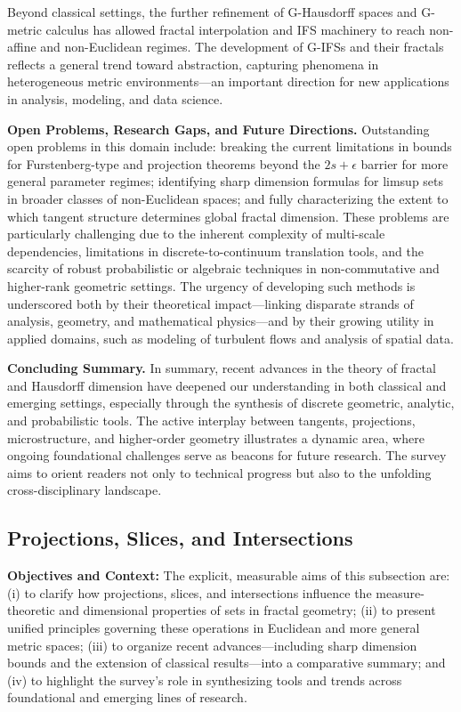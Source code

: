 \documentclass[sigconf]{acmart}
\begin{document}
Beyond classical settings, the further refinement of G-Hausdorff spaces and G-metric calculus has allowed fractal interpolation and IFS machinery to reach non-affine and non-Euclidean regimes. The development of G-IFSs and their fractals reflects a general trend toward abstraction, capturing phenomena in heterogeneous metric environments—an important direction for new applications in analysis, modeling, and data science.

\textbf{Open Problems, Research Gaps, and Future Directions.} Outstanding open problems in this domain include: breaking the current limitations in bounds for Furstenberg-type and projection theorems beyond the $2s+\epsilon$ barrier for more general parameter regimes; identifying sharp dimension formulas for limsup sets in broader classes of non-Euclidean spaces; and fully characterizing the extent to which tangent structure determines global fractal dimension. These problems are particularly challenging due to the inherent complexity of multi-scale dependencies, limitations in discrete-to-continuum translation tools, and the scarcity of robust probabilistic or algebraic techniques in non-commutative and higher-rank geometric settings. The urgency of developing such methods is underscored both by their theoretical impact—linking disparate strands of analysis, geometry, and mathematical physics—and by their growing utility in applied domains, such as modeling of turbulent flows and analysis of spatial data.

\textbf{Concluding Summary.} In summary, recent advances in the theory of fractal and Hausdorff dimension have deepened our understanding in both classical and emerging settings, especially through the synthesis of discrete geometric, analytic, and probabilistic tools. The active interplay between tangents, projections, microstructure, and higher-order geometry illustrates a dynamic area, where ongoing foundational challenges serve as beacons for future research. The survey aims to orient readers not only to technical progress but also to the unfolding cross-disciplinary landscape.

\subsection{Projections, Slices, and Intersections}

\textbf{Objectives and Context:} The explicit, measurable aims of this subsection are: (i) to clarify how projections, slices, and intersections influence the measure-theoretic and dimensional properties of sets in fractal geometry; (ii) to present unified principles governing these operations in Euclidean and more general metric spaces; (iii) to organize recent advances—including sharp dimension bounds and the extension of classical results—into a comparative summary; and (iv) to highlight the survey’s role in synthesizing tools and trends across foundational and emerging lines of research.
\end{document}
